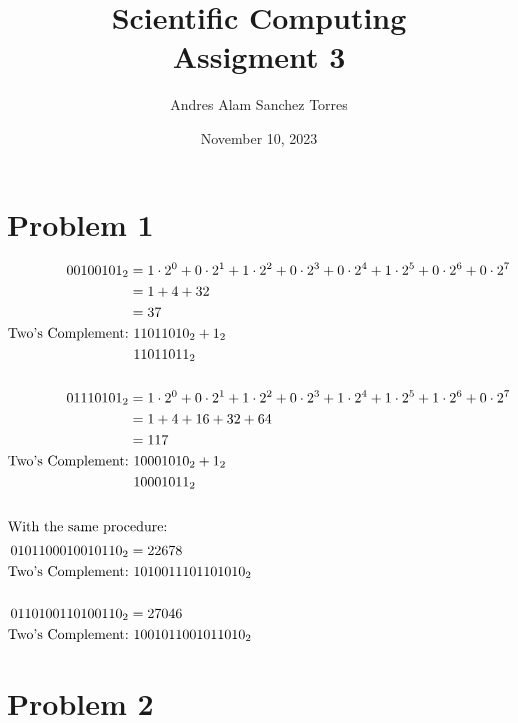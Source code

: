 \documentclass{article}
\title{Scientific Computing \\[0.2em]\smaller{}Assigment 3}
\author{Andres Alam Sanchez Torres}
\date{November 10, 2023}
\begin{document}
\maketitle

\section*{Problem 1}

\begin{align*}
  00100101_2 &= 1 \cdot 2^0 + 
               0 \cdot 2^1 + 
               1 \cdot 2^2 +
               0 \cdot 2^3 +
               0 \cdot 2^4 +
               1 \cdot 2^5 +
               0 \cdot 2^6 +
               0 \cdot 2^7 \\
             &= 1 + 
               4 +
               32\\
             &= 37 \\
  \text{Two's Complement:}&~11011010_2 + 1_2\\
                          &~11011011_2 \\ \\
  01110101_2 &= 1 \cdot 2^0 + 
             0 \cdot 2^1 + 
             1 \cdot 2^2 +
             0 \cdot 2^3 +
             1 \cdot 2^4 +
             1 \cdot 2^5 +
             1 \cdot 2^6 +
             0 \cdot 2^7 \\
           &= 1 + 
             4 +
             16 +
             32 +
             64\\
           &= 117 \\
  \text{Two's Complement:}&~10001010_2 + 1_2\\
           &~10001011_2 \\ \\
  \shortintertext{With the same procedure:}
  0101100010010110_2 &= 22678 \\
  \text{Two's Complement:}&~1010011101101010_2\\ \\
  0110100110100110_2 &= 27046 \\
  \text{Two's Complement:}&~1001011001011010_2\\
\end{align*}



\section*{Problem 2}
\end{document}
